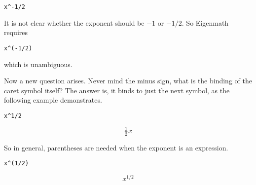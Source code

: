 \medskip
\verb$x^-1/2$

\medskip
\noindent
It is not clear whether the exponent should be $-1$ or $-1/2$.
So Eigenmath requires

\medskip
\verb$x^(-1/2)$

\medskip
\noindent
which is unambiguous.

\medskip
\noindent
Now a new question arises.
Never mind the minus sign, what is the binding of the caret symbol itself?
The answer is, it binds to just the next symbol, as the following example
demonstrates.

\medskip
\verb$x^1/2$

$$\hbox{$1\over2$}x$$

\medskip
\noindent
So in general, parentheses are needed when the exponent is an expression.

\medskip
\verb$x^(1/2)$

$$x^{1/2}$$

